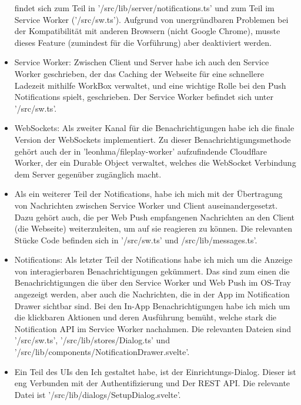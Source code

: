 \documentclass[a4paper]{article}
\begin{document}
\begin{itemize}
        findet sich zum Teil in '/src/lib/server/notifications.ts' und zum Teil
        im Service Worker ('/src/sw.ts'). Aufgrund von unergründbaren Problemen bei der
        Kompatibilität mit anderen Browsern (nicht Google Chrome), musste dieses
        Feature (zumindest für die Vorführung) aber deaktiviert werden.
  \item Service Worker: Zwischen Client und Server habe ich auch den Service
        Worker geschrieben, der das Caching der Webseite für eine schnellere
        Ladezeit mithilfe WorkBox verwaltet, und eine wichtige Rolle bei den
        Push Notifications spielt, geschrieben. Der Service Worker befindet sich
        unter '/src/sw.ts'.
  \item WebSockets: Als zweiter Kanal für die Benachrichtigungen habe ich die
        finale Version der WebSockets implementiert. Zu dieser
        Benachrichtigungsmethode gehört auch der in 'leonhma/fileplay-worker'
        aufzufindende Cloudflare Worker, der ein Durable Object verwaltet,
        welches die WebSocket Verbindung dem Server gegenüber zugänglich macht.
  \item Als ein weiterer Teil der Notifications, habe ich mich mit der
        Übertragung von Nachrichten zwischen Service Worker und Client
        auseinandergesetzt. Dazu gehört auch, die per Web Push empfangenen
        Nachrichten an den Client (die Webseite) weiterzuleiten, um auf sie
        reagieren zu können. Die relevanten Stücke Code befinden sich in
        '/src/sw.ts' und /src/lib/messages.ts'.
  \item Notifications: Als letzter Teil der Notifications habe ich mich um die
        Anzeige von interagierbaren Benachrichtigungen gekümmert. Das sind zum
        einen die Benachrichtigungen die über den Service Worker und Web Push im
        OS-Tray angezeigt werden, aber auch die Nachrichten, die in der App im
        Notification Drawer sichtbar sind. Bei den In-App Benachrichtigungen
        habe ich mich um die klickbaren Aktionen und deren Ausführung bemüht,
        welche stark die Notification API im Service Worker nachahmen. Die
        relevanten Dateien sind '/src/sw.ts', '/src/lib/stores/Dialog.ts' und
        '/src/lib/components/NotificationDrawer.svelte'.
  \item Ein Teil des UIs den Ich gestaltet habe, ist der Einrichtungs-Dialog.
        Dieser ist eng Verbunden mit der Authentifizierung und Der REST API. Die
        relevante Datei ist '/src/lib/dialogs/SetupDialog.svelte'.
\end{itemize}
\end{document}
